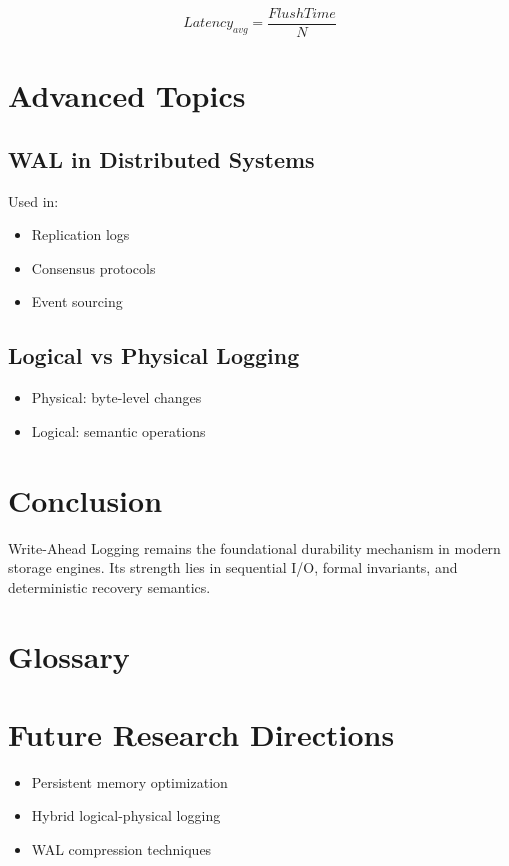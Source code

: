 \documentclass[12pt,a4paper]{report}
\begin{document}
\[
Latency_{avg} = \frac{FlushTime}{N}
\]

\chapter{Advanced Topics}

\section{WAL in Distributed Systems}

Used in:
\begin{itemize}
    \item Replication logs
    \item Consensus protocols
    \item Event sourcing
\end{itemize}

\section{Logical vs Physical Logging}

\begin{itemize}
    \item Physical: byte-level changes
    \item Logical: semantic operations
\end{itemize}

\chapter{Conclusion}

Write-Ahead Logging remains the foundational durability mechanism in modern storage engines. Its strength lies in sequential I/O, formal invariants, and deterministic recovery semantics.

\appendix

\chapter{Glossary}
\printglossaries

\chapter{Future Research Directions}

\begin{itemize}
    \item Persistent memory optimization
    \item Hybrid logical-physical logging
    \item WAL compression techniques
\end{itemize}

\printbibliography
\end{document}
